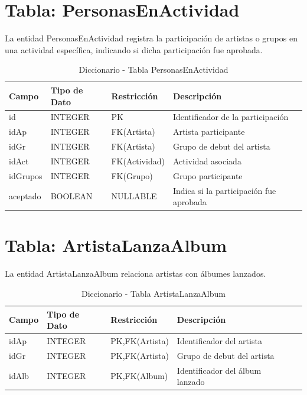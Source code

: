 \documentclass[12pt,a4paper,spanish,oneside]{report}
\begin{document}
\section{Tabla: PersonasEnActividad}
La entidad PersonasEnActividad registra la participación de artistas o grupos en
una actividad específica, indicando si dicha participación fue aprobada.
\begin{table}[H]
\centering
\caption{Diccionario - Tabla PersonasEnActividad}
\begin{tabular}{|l|l|l|l|l|}
\hline
\textbf{Campo} & \textbf{Tipo de Dato} & \textbf{Restricción} & \textbf{Descripción} \\
\hline
id & INTEGER & PK & Identificador de la participación\\
\hline
idAp & INTEGER & FK(Artista) & Artista participante \\
\hline
idGr & INTEGER & FK(Artista) & Grupo de debut del artista \\
\hline
idAct & INTEGER & FK(Actividad) & Actividad asociada\\
\hline
idGrupos & INTEGER & FK(Grupo) & Grupo participante \\
\hline
aceptado & BOOLEAN & NULLABLE & Indica si la participación fue aprobada \\
\hline
\end{tabular}
\end{table}

\section{Tabla: ArtistaLanzaAlbum}
La entidad ArtistaLanzaAlbum relaciona artistas con álbumes lanzados.
\begin{table}[H]
\centering
\caption{Diccionario - Tabla ArtistaLanzaAlbum}
\begin{tabular}{|l|l|l|l|l|}
\hline
\textbf{Campo} & \textbf{Tipo de Dato} & \textbf{Restricción} & \textbf{Descripción} \\
\hline
idAp & INTEGER & PK,FK(Artista) & Identificador del artista\\
\hline
idGr & INTEGER & PK,FK(Artista) & Grupo de debut del artista \\
\hline
idAlb & INTEGER & PK,FK(Album) & Identificador del álbum lanzado \\
\hline
\end{tabular}
\end{table}
\end{document}
